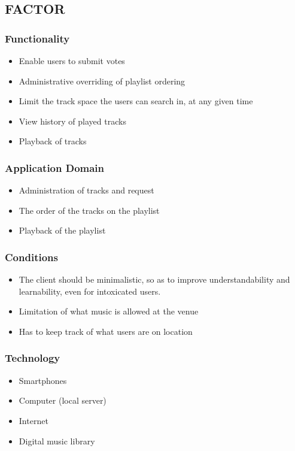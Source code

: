 \subsection{FACTOR}
\subsubsection{Functionality}
\begin{itemize}
    \item Enable users to submit votes
    \item Administrative overriding of playlist ordering
    \item Limit the track space the users can search in, at any given time
    \item View history of played tracks
    \item Playback of tracks
\end{itemize}

\subsubsection{Application Domain}
\begin{itemize}
    \item Administration of tracks and request
    \item The order of the tracks on the playlist
    \item Playback of the playlist
\end{itemize}

\subsubsection{Conditions}
\begin{itemize}
    \item The client should be minimalistic, so as to improve understandability and learnability, even for intoxicated users.
    \item Limitation of what music is allowed at the venue
    \item Has to keep track of what users are on location
\end{itemize}

\subsubsection{Technology}
\begin{itemize}
    \item Smartphones
    \item Computer (local server)
    \item Internet
    \item Digital music library
\end{itemize}


